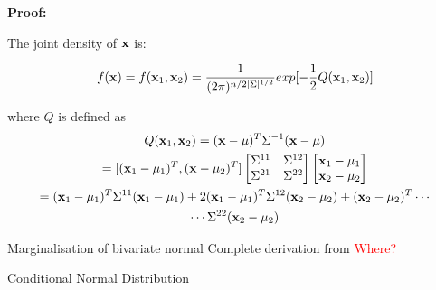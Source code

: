 \documentclass{beamer}
\begin{document}
\begin{frame}
	\textbf{Proof:}
	
	The joint density of ${\bf x}$ is:
	
	\begin{equation}
	f({\bf x})=f({\bf x}_1,{\bf x}_2)=\frac{1}{(2\pi)^{n/2\vert\Sigma\vert^{1/2}}}exp[-\frac{1}{2}Q({\bf x}_1,{\bf x}_2)] 
	\end{equation}
	
	where $Q$ is defined as
	\begin{gather}
		Q({\bf x}_1,{\bf x}_2) = ({\bf x}-\mu)^T\Sigma^{-1}({\bf x}-\mu)\\
		= [({\bf x}_1-\mu_1)^T, ({\bf x}-\mu_2)^T] 
		\begin{bmatrix}
			\Sigma^{11} & \Sigma^{12}\\
			\Sigma^{21} & \Sigma^{22}
		\end{bmatrix}
		\begin{bmatrix}
			{\bf x}_1-\mu_1 \\
			{\bf x}_2-\mu_2
		\end{bmatrix}\\
		= ({\bf x}_1-\mu_1)^T\Sigma^{11}({\bf x}_1-\mu_1)+ 2({\bf x}_1-\mu_1)^T\Sigma^{12}({\bf x}_2-\mu_2) + ({\bf x}_2-\mu_2)^T \cdots \\
		\cdots \Sigma^{22}({\bf x}_2-\mu_2)
	\end{gather}
\end{frame}

\begin{frame}{Marginalisation of bivariate normal}
	Complete derivation from \textcolor{red}{Where?}
\end{frame}

\begin{frame}{Conditional Normal Distribution}

\end{frame}
\end{document}

